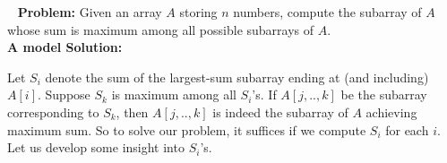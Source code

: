 \documentclass[11pt]{article}
\newcommand{\handout}[5]{
  \noindent
  \begin{center}
  \framebox{
    \vbox{
      \hbox to 5.78in { {\bf A model solution for an algorithmic problem} }
      \vspace{4mm}
      \hbox to 5.78in { {\Large \hfill #5  \hfill} }
      \vspace{2mm}
      \hbox to 5.78in { {\em #3 \hfill #4} }
    }
  }
  \end{center}
  \vspace*{4mm}
}
\newcommand{\lecture}[4]{\handout{#1}{#2}{#3}{}{#1}}
\begin{document}
~\vspace*{-.5cm}
{\bf Problem:} Given an array $A$ storing $n$ numbers, compute the
subarray of $A$ whose sum is maximum among all possible subarrays of $A$.\\


\noindent
{\bf A model Solution:}

Let $S_i$ denote the sum of the largest-sum subarray ending at (and including) 
$A[i]$. Suppose $S_k$ is maximum among all $S_i$'s. If $A[j,..,k]$ be the 
subarray corresponding to $S_k$, then $A[j,..,k]$ is indeed the subarray of 
$A$ achieving maximum sum. So to solve our problem, it suffices if
we compute $S_i$ for each $i$. Let us develop some insight into $S_i$'s.
\end{document}
